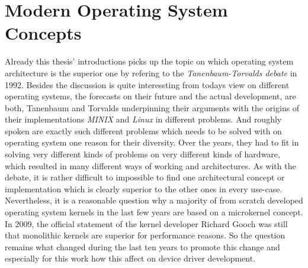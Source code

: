 
\chapter{Modern Operating System Concepts}\label{ch:modern-os-concepts}


Already this thesis' introductions picks up the topic on which operating system architecture is the superior one by refering to the \textit{Tanenbaum-Torvalds debate}\cite{linux-is-obsolete} in 1992.
Besides the discussion is quite interessting from todays view on different operating systems, the forecasts on their future and the actual development, are both, Tanenbaum and Torvalds underpinning their arguments with the origins of their implementations \textit{MINIX} and \textit{Linux} in different problems. 
And roughly spoken are exactly such different problems which needs to be solved with on operating system one reason for their diversity. 
Over the years, they had to fit in solving very different kinds of problems on very different kinds of hardware, which resulted in many different ways of working and architectures. 
As with the debate, it is rather difficult to impossible to find one architectural concept or implementation which is clearly superior to the other ones in every use-case. 
Nevertheless, it is a reasonable question why a majority of from scratch developed operating system kernels in the last few years are based on a microkernel concept.
In 2009, the official statement of the kernel developer Richard Gooch was still that monolithic kernels are superior for performance reasons\cite{why-linux-monolith}.
So the question remains what changed during the last ten years to promote this change and especially for this work how this affect on device driver development.


